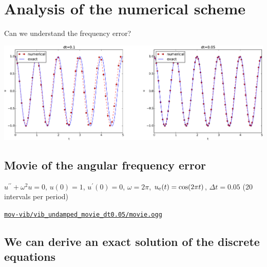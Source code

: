 \documentclass[%
oneside,                 %
final,                   %
10pt]{article}
\newenvironment{doconce:movie}{}{}
\newcounter{doconce:movie:counter}
\begin{document}
\section*{Analysis of the numerical scheme}
\label{vib:model1:analysis}


\begin{center}
\begin{Sbox}
\begin{minipage}{0.85\linewidth}
Can we understand the frequency error?
\end{minipage}
\end{Sbox}
\fbox{\TheSbox}
\end{center}



\centerline{\includegraphics[width=1.0\linewidth]{fig-vib/vib_freq_err1.pdf}}



\subsection*{Movie of the angular frequency error}

$u^{\prime\prime} + \omega^2 u = 0$, $u(0)=1$, $u^{\prime}(0)=0$,
$\omega=2\pi$, $\uex(t)=\cos (2\pi t)$, $\Delta t = 0.05$ (20 intervals
per period)


\vspace{3mm}




\begin{doconce:movie}
\begin{center}
\href{run:mov-vib/vib_undamped_movie_dt0.05/movie.ogg}{\nolinkurl{mov-vib/vib_undamped_movie_dt0.05/movie.ogg}}
\end{center}
\end{doconce:movie}


\subsection*{We can derive an exact solution of the discrete equations}
\end{document}
